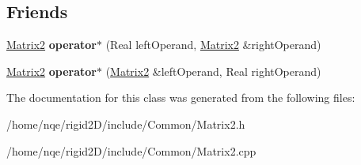 \subsection*{Friends}
\begin{DoxyCompactItemize}
\item 
\hypertarget{class_rigid2_d_1_1_matrix2_ade66d67eac0370c6cec115fb8a0ef25a}{
\hyperlink{class_rigid2_d_1_1_matrix2}{Matrix2} {\bfseries operator$\ast$} (Real leftOperand, \hyperlink{class_rigid2_d_1_1_matrix2}{Matrix2} \&rightOperand)}
\label{class_rigid2_d_1_1_matrix2_ade66d67eac0370c6cec115fb8a0ef25a}

\item 
\hypertarget{class_rigid2_d_1_1_matrix2_ae1ad1e38e830c043770efbfa92bac5ac}{
\hyperlink{class_rigid2_d_1_1_matrix2}{Matrix2} {\bfseries operator$\ast$} (\hyperlink{class_rigid2_d_1_1_matrix2}{Matrix2} \&leftOperand, Real rightOperand)}
\label{class_rigid2_d_1_1_matrix2_ae1ad1e38e830c043770efbfa92bac5ac}

\end{DoxyCompactItemize}


The documentation for this class was generated from the following files:\begin{DoxyCompactItemize}
\item 
/home/nqe/rigid2D/include/Common/Matrix2.h\item 
/home/nqe/rigid2D/include/Common/Matrix2.cpp\end{DoxyCompactItemize}
